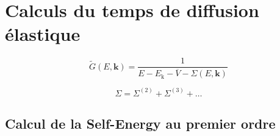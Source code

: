 \chapter{Calculs du temps de diffusion élastique}


\begin{equation}
\widetilde{G}(E,\mathbf{k})=\frac{1}{E-E_{\mathrm{k}}-\overline{V}-\Sigma(E,\mathbf{k})}
\end{equation}

\begin{equation}
\Sigma=\Sigma^{(2)} + \Sigma^{(3)} + \dots
\end{equation}



\section{Calcul de la Self-Energy au premier ordre}
